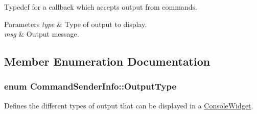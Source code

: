 Typedef for a callback which accepts output from commands. 


\begin{DoxyParams}{Parameters}
{\em type} & Type of output to display. \\
\hline
{\em msg} & Output message. \\
\hline
\end{DoxyParams}


\subsection{Member Enumeration Documentation}
\hypertarget{class_command_sender_info_a3a5e6a2ef1772f6557f351652c2e3b60}{
\subsubsection[{Output\-Type}]{\setlength{\rightskip}{0pt plus 5cm}enum {\bf Command\-Sender\-Info\-::\-Output\-Type}}}\label{class_command_sender_info_a3a5e6a2ef1772f6557f351652c2e3b60}


Defines the different types of output that can be displayed in a \hyperlink{class_console_widget}{Console\-Widget}. 

